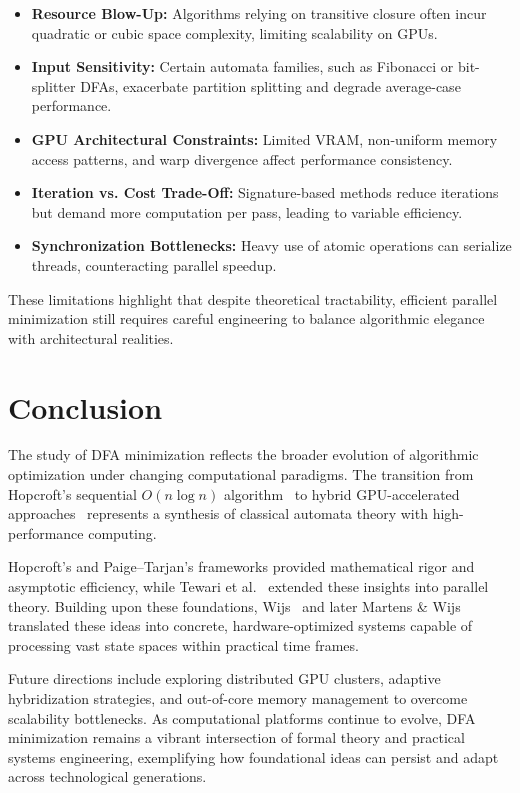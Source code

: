 \begin{itemize}
    \item \textbf{Resource Blow-Up:} Algorithms relying on transitive closure often incur quadratic or cubic space complexity, limiting scalability on GPUs.
    \item \textbf{Input Sensitivity:} Certain automata families, such as Fibonacci or bit-splitter DFAs, exacerbate partition splitting and degrade average-case performance.
    \item \textbf{GPU Architectural Constraints:} Limited VRAM, non-uniform memory access patterns, and warp divergence affect performance consistency.
    \item \textbf{Iteration vs. Cost Trade-Off:} Signature-based methods reduce iterations but demand more computation per pass, leading to variable efficiency.
    \item \textbf{Synchronization Bottlenecks:} Heavy use of atomic operations can serialize threads, counteracting parallel speedup.
\end{itemize}

These limitations highlight that despite theoretical tractability, efficient parallel minimization still requires careful engineering to balance algorithmic elegance with architectural realities.

\section{Conclusion}

The study of DFA minimization reflects the broader evolution of algorithmic optimization under changing computational paradigms. The transition from Hopcroft’s sequential $O(n \log n)$ algorithm~\cite{hopcroft1971} to hybrid GPU-accelerated approaches~\cite{martenswijs2024} represents a synthesis of classical automata theory with high-performance computing. 

Hopcroft’s and Paige–Tarjan’s frameworks provided mathematical rigor and asymptotic efficiency, while Tewari et al.~\cite{tewari2002} extended these insights into parallel theory. Building upon these foundations, Wijs~\cite{wijs2015} and later Martens \& Wijs~\cite{martenswijs2024} translated these ideas into concrete, hardware-optimized systems capable of processing vast state spaces within practical time frames.

Future directions include exploring distributed GPU clusters, adaptive hybridization strategies, and out-of-core memory management to overcome scalability bottlenecks. As computational platforms continue to evolve, DFA minimization remains a vibrant intersection of formal theory and practical systems engineering, exemplifying how foundational ideas can persist and adapt across technological generations.
